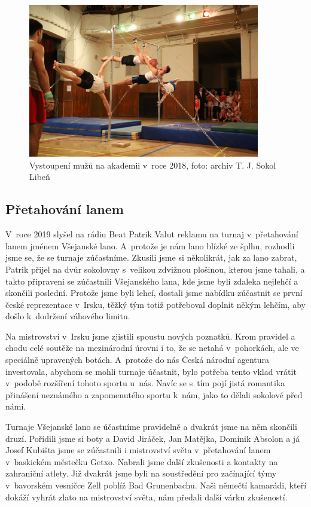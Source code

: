 \documentclass[a5paper, 11pt, twoside]{article}
\begin{document}
\begin{figure}[h]
  \centering 
  \includegraphics[width=0.9\textwidth]{img/75_akademie_muzi.JPG}
  \caption*{Vystoupení mužů na akademii v~roce 2018, foto: archiv T. J. Sokol
  Libeň}
\end{figure}

\subsection{Přetahování lanem}

V~roce 2019 slyšel na rádiu Beat Patrik Valut reklamu na turnaj
v~přetahování lanem jménem Všejanské lano. A~protože je nám lano blízké ze
šplhu, rozhodli jsme se, že se turnaje zúčastníme. Zkusili jsme si
několikrát, jak za lano zabrat, Patrik přijel na dvůr sokolovny
s~velikou zdvižnou plošinou, kterou jsme tahali, a takto připraveni se
zúčastnili Všejanského lana, kde jsme byli zdaleka nejlehčí a skončili
poslední. Protože jsme byli lehcí, dostali jsme nabídku zúčastnit se
první české reprezentace v~Irsku, těžký tým totiž potřeboval doplnit
někým lehčím, aby došlo k~dodržení váhového limitu.

Na mistrovství v~Irsku jsme zjistili spoustu nových poznatků. Krom
pravidel a chodu celé soutěže na mezinárodní úrovni i to, že se netahá
v~pohorkách, ale ve speciálně upravených botách. A~protože do nás Česká
národní agentura investovala, abychom se mohli turnaje účastnit, bylo
potřeba tento vklad vrátit v~podobě rozšíření tohoto sportu u~nás. Navíc
se s~tím pojí jistá romantika přinášení neznámého a zapomenutého sportu
k~nám, jako to dělali sokolové před námi.

Turnaje Všejanské lano se účastníme pravidelně a dvakrát jsme na něm
skončili druzí. Pořídili jsme si boty a David Jiráček, Jan Matějka,
Dominik Absolon a já Josef Kubišta jsme se zúčastnili i mistrovství
světa v~přetahování lanem v~baskickém městečku Getxo. Nabrali jsme další
zkušenosti a kontakty na zahraniční atlety. Již dvakrát jsme byli na
soustředění pro začínající týmy v~bavorském vesničce Zell poblíž Bad
Grunenbachu. Naši němečtí kamarádi, kteří dokáží vyhrát zlato na
mistrovství světa, nám předali další várku zkušeností.
\end{document}

